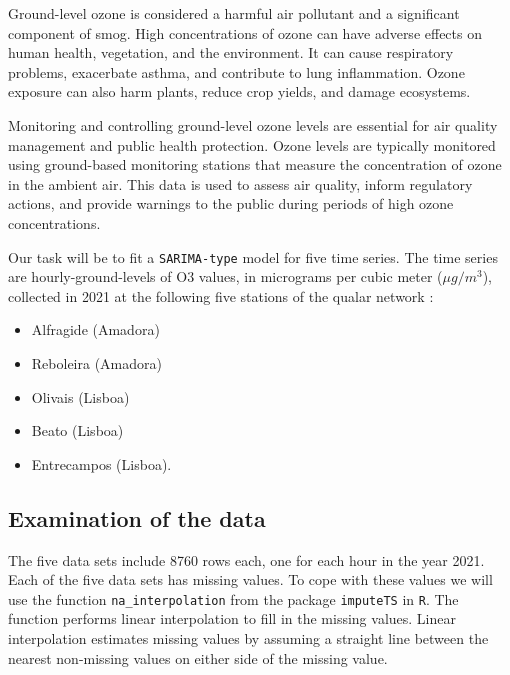 \documentclass{article}
\begin{document}
Ground-level ozone is considered a harmful air pollutant and a significant component of smog. High concentrations of ozone can have adverse effects on human health, vegetation, and the environment. It can cause respiratory problems, exacerbate asthma, and contribute to lung inflammation. Ozone exposure can also harm plants, reduce crop yields, and damage ecosystems.

Monitoring and controlling ground-level ozone levels are essential for air quality management and public health protection. Ozone levels are typically monitored using ground-based monitoring stations that measure the concentration of ozone in the ambient air. This data is used to assess air quality, inform regulatory actions, and provide warnings to the public during periods of high ozone concentrations. \cite{i1}

Our task will be to fit a \verb|SARIMA-type| model for five time series. The time series are hourly-ground-levels of $\text{O}3$ values, in micrograms per cubic meter ($\mu g/m^3$), collected in 2021 at the following five stations of the qualar network \cite{i2}:

\begin{itemize}
    \item Alfragide (Amadora)
    \item  Reboleira (Amadora)
    \item  Olivais (Lisboa)
    \item  Beato (Lisboa)
    \item  Entrecampos (Lisboa).
\end{itemize}


\subsection{Examination of the data}

The five data sets include 8760 rows each, one for each hour in the year 2021.
Each of the five data sets has missing values. To cope with these values we will use the function \verb|na_interpolation| from the package \verb|imputeTS|  in \verb|R|. The function performs linear interpolation to fill in the missing values. Linear interpolation estimates missing values by assuming a straight line between the nearest non-missing values on either side of the missing value.
\end{document}
